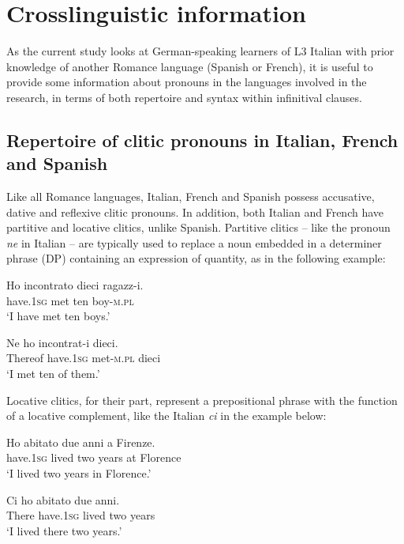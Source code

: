 \documentclass[output=paper,modfonts,nonflat,newtxmath]{langsci/langscibook}
\begin{document}
\section{Crosslinguistic information}%
\label{sec:sciutti:2}

As the current study looks at German-speaking learners of L3 Italian with prior knowledge of another Romance language (Spanish or French), it is useful to provide some information about pronouns in the languages involved in the research, in terms of both repertoire and syntax within infinitival clauses.

\subsection{{Repertoire} {of} {clitic} {pronouns} {in} {Italian,} {French} {and} {Spanish}}%
\label{sec:sciutti:2.1}

Like all Romance languages, Italian, French and Spanish possess accusative, dative and reflexive clitic pronouns. In addition, both Italian and French have partitive and locative clitics, unlike Spanish. Partitive clitics – like the pronoun \textit{ne} in Italian – are typically used to replace a noun embedded in a determiner phrase (DP) containing an expression of quantity, as in the following example:


\ea \label{ex:sciutti:1}
\begin{xlist}
    \ex \label{ex:sciutti:1a}
    \gll Ho incontrato dieci ragazz-i.\\
        have.\textsc{1sg} met ten boy-\textsc{m.pl}\\
    \glt  ‘I have met ten boys.’

    \ex \label{ex:sciutti:1b}
    \gll Ne ho incontrat-i dieci.\\
        Thereof have.\textsc{1sg} met-\textsc{m.pl} dieci \\
    \glt ‘I met ten of them.’

\end{xlist}
\z


Locative clitics, for their part, represent a prepositional phrase with the function of a locative complement, like the Italian \textit{ci} in the example below:

\ea \label{ex:sciutti:2}
\begin{xlist}
    \ex \label{ex:sciutti:2a}
    \gll Ho abitato due anni a Firenze.\\
        have.\textsc{1sg} lived two years at Florence\\
    \glt  ‘I lived two years in Florence.’

    \ex \label{ex:sciutti:2b}
    \gll Ci ho abitato due anni.\\
        There have.\textsc{1sg} lived two years\\
    \glt ‘I lived there two years.’
\end{xlist}
\z
\end{document}
